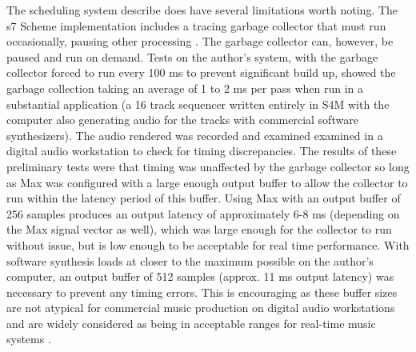 \documentclass[acmsmall]{acmart}
\begin{document}
The scheduling system describe does have several limitations worth noting.
The s7 Scheme implementation includes a tracing garbage collector 
that must run occasionally, pausing other processing \cite{Matheussen2020}.
The garbage collector can, however, be paused and run on demand. Tests on the author's
system, with the garbage collector forced to run every 100 ms to prevent
significant build up, showed the garbage collection taking an average of 1 to 2 ms per pass
when run in a substantial application (a 16 track sequencer written entirely in S4M
with the computer also generating audio for the tracks with commercial
software synthesizers).  
The audio rendered was recorded and examined
examined in a digital audio workstation to check for timing discrepancies. The
results of these preliminary tests were that timing was unaffected by the 
garbage collector so long as Max was configured with 
a large enough output buffer to allow the collector to run within the 
latency period of this buffer.
Using Max with an output buffer of 256 samples produces an output latency
of approximately 6-8 ms (depending on the Max signal vector as well), which
was large enough for the collector to run without issue, but is 
low enough to be acceptable for real time performance. With software synthesis
loads at closer to the maximum possible on the author's computer,
an output buffer of 512 samples (approx. 11 ms output latency) was necessary to prevent
any timing errors. This is encouraging as these buffer sizes are not atypical
for commercial music production on digital audio workstations and are widely
considered as being in acceptable ranges for real-time music systems \cite{Brandt1998}.
\end{document}
